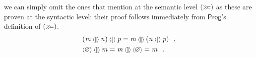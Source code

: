 \documentclass{llncs}
\newcommand{\Conid}[1]{\mathit{#1}}
\newcommand{\Varid}[1]{\mathit{#1}}
\let\Varid\mathit
\let\Conid\mathsf
\begin{document}
we can simply omit the ones that mention at the semantic level \ensuremath{(\mathrel{\hstretch{0.7}{>\!\!>\!\!=}})}
as these are proven at the syntactic level: their proof follows immediately
from \ensuremath{\Conid{Prog}}'s definition of \ensuremath{(\mathrel{\hstretch{0.7}{>\!\!>\!\!=}})}.
\begin{align}
  &\ensuremath{(\Varid{m}\mathbin{\scaleobj{0.8}{\langle[\!]\rangle}}\Varid{n})\mathbin{\scaleobj{0.8}{\langle[\!]\rangle}}\Varid{p}} = \ensuremath{\Varid{m}\mathbin{\scaleobj{0.8}{\langle[\!]\rangle}}(\Varid{n}\mathbin{\scaleobj{0.8}{\langle[\!]\rangle}}\Varid{p})} \mbox{~~,} \\
  &\ensuremath{\scaleobj{0.8}{\langle}\varnothing\scaleobj{0.8}{\rangle}\mathbin{\scaleobj{0.8}{\langle[\!]\rangle}}\Varid{m}} = \ensuremath{\Varid{m}\mathbin{\scaleobj{0.8}{\langle[\!]\rangle}}\scaleobj{0.8}{\langle}\varnothing\scaleobj{0.8}{\rangle}} = \ensuremath{\Varid{m}} \mbox{~~.}
\end{align}
\end{document}
